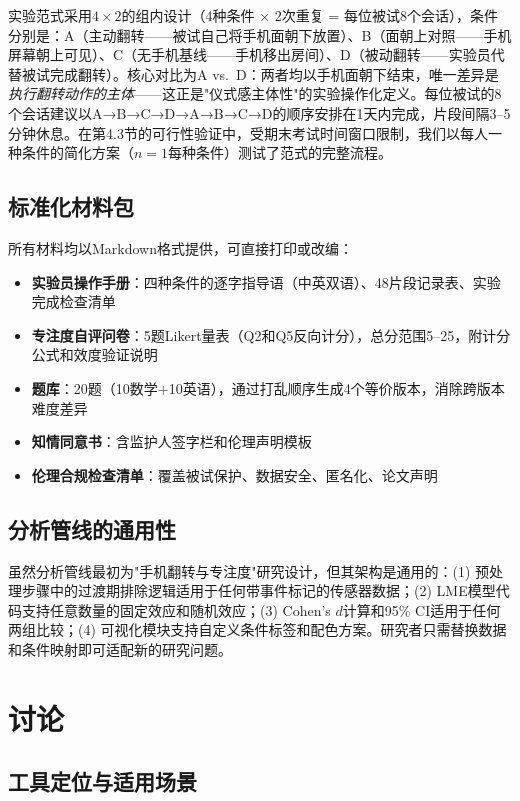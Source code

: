 \documentclass[12pt,a4paper]{ctexart}
\begin{document}
实验范式采用$4 \times 2$的组内设计（4种条件 $\times$ 2次重复 = 每位被试8个会话），条件分别是：A（主动翻转——被试自己将手机面朝下放置）、B（面朝上对照——手机屏幕朝上可见）、C（无手机基线——手机移出房间）、D（被动翻转——实验员代替被试完成翻转）。核心对比为A vs.\ D：两者均以手机面朝下结束，唯一差异是\emph{执行翻转动作的主体}——这正是"仪式感主体性"的实验操作化定义。每位被试的8个会话建议以A→B→C→D→A→B→C→D的顺序安排在1天内完成，片段间隔3--5分钟休息。在第4.3节的可行性验证中，受期末考试时间窗口限制，我们以每人一种条件的简化方案（$n=1$每种条件）测试了范式的完整流程。

\subsection{标准化材料包}

所有材料均以Markdown格式提供，可直接打印或改编：

\begin{itemize}[leftmargin=*]
    \item \textbf{实验员操作手册}：四种条件的逐字指导语（中英双语）、48片段记录表、实验完成检查清单
    \item \textbf{专注度自评问卷}：5题Likert量表（Q2和Q5反向计分），总分范围5--25，附计分公式和效度验证说明
    \item \textbf{题库}：20题（10数学+10英语），通过打乱顺序生成4个等价版本，消除跨版本难度差异
    \item \textbf{知情同意书}：含监护人签字栏和伦理声明模板
    \item \textbf{伦理合规检查清单}：覆盖被试保护、数据安全、匿名化、论文声明
\end{itemize}

\subsection{分析管线的通用性}

虽然分析管线最初为"手机翻转与专注度"研究设计，但其架构是通用的：(1) 预处理步骤中的过渡期排除逻辑适用于任何带事件标记的传感器数据；(2) LME模型代码支持任意数量的固定效应和随机效应；(3) Cohen's $d$计算和95\% CI适用于任何两组比较；(4) 可视化模块支持自定义条件标签和配色方案。研究者只需替换数据和条件映射即可适配新的研究问题。

\section{讨论}

\subsection{工具定位与适用场景}
\end{document}
